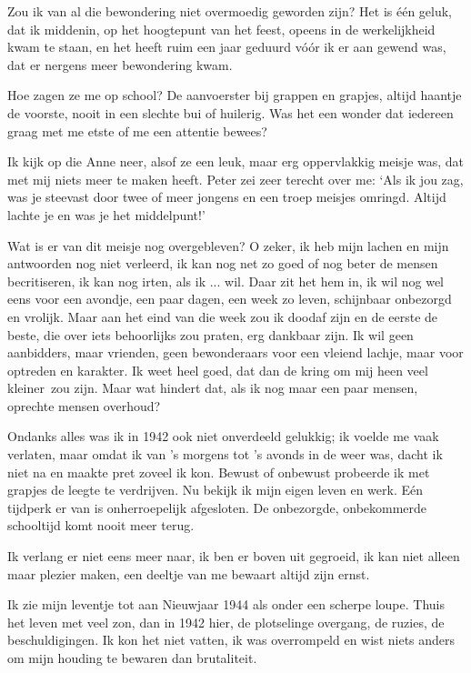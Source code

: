 \documentclass{book}
\begin{document}
Zou ik van al die bewondering niet overmoedig geworden zijn? Het is één
geluk, dat ik middenin, op het hoogtepunt van het feest, opeens in de
werkelijkheid kwam te staan, en het heeft ruim een jaar geduurd vóór ik
er aan gewend was, dat er nergens meer bewondering kwam.

Hoe zagen ze me op school? De aanvoerster bij grappen en grapjes, altijd
haantje de voorste, nooit in een slechte bui of huilerig. Was het een
wonder dat iedereen graag met me etste of me een attentie bewees?

Ik kijk op die Anne neer, alsof ze een leuk, maar erg oppervlakkig
meisje was, dat met mij niets meer te maken heeft. Peter zei zeer
terecht over me: `Als ik jou zag, was je steevast door twee of meer
jongens en een troep meisjes omringd. Altijd lachte je en was je het
middelpunt!'

Wat is er van dit meisje nog overgebleven? O zeker, ik heb mijn lachen
en mijn antwoorden nog niet verleerd, ik kan nog net zo goed of nog
beter de mensen becritiseren, ik kan nog irten, als ik ... wil. Daar zit
het hem in, ik wil nog wel eens voor een avondje, een paar dagen, een
week zo leven, schijnbaar onbezorgd en vrolijk. Maar aan het eind van
die week zou ik doodaf zijn en de eerste de beste, die over iets
behoorlijks zou praten, erg dankbaar zijn. Ik wil geen aanbidders, maar
vrienden, geen bewonderaars voor een vleiend lachje, maar voor optreden
en karakter. Ik weet heel goed, dat dan de kring om mij heen veel
kleiner~zou zijn. Maar wat hindert dat, als ik nog maar een paar mensen,
oprechte mensen overhoud?

Ondanks alles was ik in 1942 ook niet onverdeeld gelukkig; ik voelde me
vaak verlaten, maar omdat ik van 's morgens tot 's avonds in de weer
was, dacht ik niet na en maakte pret zoveel ik kon. Bewust of onbewust
probeerde ik met grapjes de leegte te verdrijven. Nu bekijk ik mijn
eigen leven en werk. Eén tijdperk er van is onherroepelijk afgesloten.
De onbezorgde, onbekommerde schooltijd komt nooit meer terug.

Ik verlang er niet eens meer naar, ik ben er boven uit gegroeid, ik kan
niet alleen maar plezier maken, een deeltje van me bewaart altijd zijn
ernst.

Ik zie mijn leventje tot aan Nieuwjaar 1944 als onder een scherpe loupe.
Thuis het leven met veel zon, dan in 1942 hier, de plotselinge overgang,
de ruzies, de beschuldigingen. Ik kon het niet vatten, ik was
overrompeld en wist niets anders om mijn houding te bewaren dan
brutaliteit.
\end{document}
